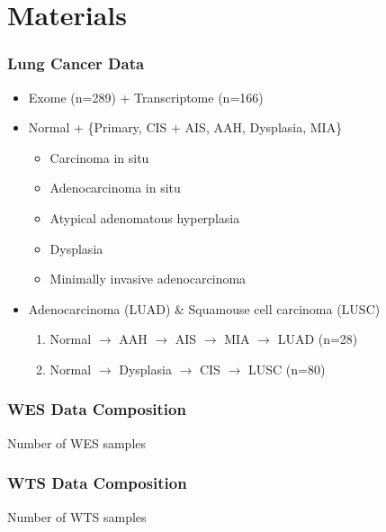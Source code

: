 \documentclass{beamer}
\begin{document}
    \section{Materials}
    \begin{frame}
        \frametitle{Lung Cancer Data}

        \begin{itemize}
            \item Exome (n=289) + Transcriptome (n=166)
            \item Normal + \{Primary, CIS + AIS, AAH, Dysplasia, MIA\}
            \begin{itemize}
                \item Carcinoma in situ
                \item Adenocarcinoma in situ
                \item Atypical adenomatous hyperplasia
                \item Dysplasia
                \item Minimally invasive adenocarcinoma
            \end{itemize}
            \item Adenocarcinoma (LUAD) \& Squamouse cell carcinoma (LUSC)
            \begin{enumerate}
                \item Normal $\rightarrow$ AAH $\rightarrow$ AIS $\rightarrow$ MIA $\rightarrow$ LUAD (n=28)
                \item Normal $\rightarrow$ Dysplasia $\rightarrow$ CIS $\rightarrow$ LUSC (n=80)
            \end{enumerate}
        \end{itemize}
    \end{frame}

    \begin{frame}
        \frametitle{WES Data Composition}

        \begin{table}
            \caption{Number of WES samples}
            \resizebox{!}{0.3 \textheight}
            {}
        \end{table}
    \end{frame}

    \begin{frame}
        \frametitle{WTS Data Composition}

        \begin{table}
            \caption{Number of WTS samples}
            
        \end{table}
    \end{frame}
\end{document}
